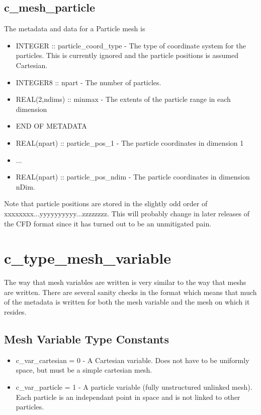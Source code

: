 \documentclass[8pt]{article} \usepackage{url,graphicx,tabularx,array}
\begin{document}
\subsection{c\_mesh\_particle}

The metadata and data for a Particle mesh is
\begin{itemize}
\item INTEGER :: particle\_coord\_type - The type of coordinate system for the
  particles. This is currently ignored and the particle positions is assumed
  Cartesian.
\item INTEGER8 :: npart - The number of particles.
\item REAL(2,ndims) :: minmax - The extents of the particle range in each
  dimension
\item END OF METADATA
\item REAL(npart) :: particle\_pos\_1 - The particle coordinates in dimension 1
\item ...
\item REAL(npart) :: particle\_pos\_ndim - The particle coordinates in
  dimension nDim.
\end{itemize}

Note that particle positions are stored in the slightly odd order
of xxxxxxxx...yyyyyyyyyy...zzzzzzzz. This will probably change in later
releases of the CFD format since it has turned out to be an unmitigated pain.

\section{c\_type\_mesh\_variable}

The way that mesh variables are written is very similar to the way that meshs
are written. There are several sanity checks in the format which means that
much of the metadata is written for both the mesh variable and the mesh on
which it resides.

\subsection{Mesh Variable Type Constants}
\begin{itemize}
\item c\_var\_cartesian = 0 - A Cartesian variable. Does not have to be
  uniformly space, but must be a simple cartesian mesh.
\item c\_var\_particle = 1 - A particle variable (fully unstructured unlinked
  mesh). Each particle is an independant point in space and is not linked to
  other particles.
\end{itemize}
\end{document}

